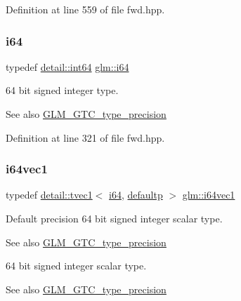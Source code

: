 Definition at line 559 of file fwd.\+hpp.

\mbox{\label{group__gtc__type__precision_gac7a7eaad46064fc952b06df33689da23}} 
\subsubsection{\texorpdfstring{i64}{i64}}
{\footnotesize\ttfamily typedef \hyperlink{namespaceglm_1_1detail_a5b1c3227ec636c24a0676746381adfc8}{detail\+::int64} \hyperlink{group__gtc__type__precision_gac7a7eaad46064fc952b06df33689da23}{glm\+::i64}}

64 bit signed integer type. \begin{DoxySeeAlso}{See also}
\hyperlink{group__gtc__type__precision}{G\+L\+M\+\_\+\+G\+T\+C\+\_\+type\+\_\+precision} 
\end{DoxySeeAlso}


Definition at line 321 of file fwd.\+hpp.

\mbox{\label{group__gtc__type__precision_ga8bc234da7e4a6436e01241f439fc7ddd}} 
\subsubsection{\texorpdfstring{i64vec1}{i64vec1}}
{\footnotesize\ttfamily typedef \hyperlink{structglm_1_1detail_1_1tvec1}{detail\+::tvec1}$<$ \hyperlink{group__gtc__type__precision_gac7a7eaad46064fc952b06df33689da23}{i64}, \hyperlink{namespaceglm_a0f04f086094c747d227af4425893f545a9d21ccd8b5a009ec7eb7677befc3bf51}{defaultp} $>$ \hyperlink{group__gtc__type__precision_ga8bc234da7e4a6436e01241f439fc7ddd}{glm\+::i64vec1}}

Default precision 64 bit signed integer scalar type. \begin{DoxySeeAlso}{See also}
\hyperlink{group__gtc__type__precision}{G\+L\+M\+\_\+\+G\+T\+C\+\_\+type\+\_\+precision}
\end{DoxySeeAlso}
64 bit signed integer scalar type. \begin{DoxySeeAlso}{See also}
\hyperlink{group__gtc__type__precision}{G\+L\+M\+\_\+\+G\+T\+C\+\_\+type\+\_\+precision} 
\end{DoxySeeAlso}


